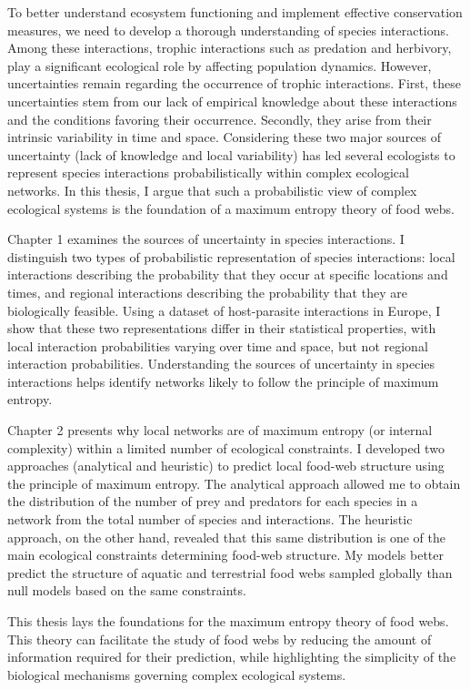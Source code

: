 \documentclass[12pt,twoside,phd]{dms}
\numberwithin{equation}{section}
\numberwithin{table}{chapter}
\numberwithin{figure}{chapter}
\begin{document}
To better understand ecosystem functioning and implement effective conservation
measures, we need to develop a thorough understanding of species
interactions. Among these interactions, trophic interactions such as predation
and herbivory, play a significant ecological role by affecting
population dynamics. However, uncertainties remain regarding the occurrence of
trophic interactions. First, these uncertainties stem from our lack of empirical
knowledge about these interactions and the conditions favoring their occurrence.
Secondly, they arise from their intrinsic variability in time and space.
Considering these two major sources of uncertainty (lack of knowledge and local
variability) has led several ecologists to represent species interactions
probabilistically within complex ecological networks. In this thesis, I argue
that such a probabilistic view of complex ecological systems is the foundation
of a maximum entropy theory of food webs.

Chapter 1 examines the sources of uncertainty in species interactions. I
distinguish two types of probabilistic representation of species interactions:
local interactions describing the probability that they occur at specific
locations and times, and regional interactions describing the probability that
they are biologically feasible. Using a dataset of host-parasite interactions in
Europe, I show that these two representations differ in their statistical
properties, with local interaction probabilities varying over time and space,
but not regional interaction probabilities. Understanding the sources of
uncertainty in species interactions helps identify networks likely to follow the
principle of maximum entropy.

Chapter 2 presents why local networks are of maximum entropy (or internal
complexity) within a limited number of ecological constraints. I developed two
approaches (analytical and heuristic) to predict local food-web structure using
the principle of maximum entropy. The analytical approach allowed me to obtain
the distribution of the number of prey and predators for each species in a
network from the total number of species and interactions. The heuristic
approach, on the other hand, revealed that this same distribution is one of the
main ecological constraints determining food-web structure. My models better
predict the structure of aquatic and terrestrial food webs sampled globally than
null models based on the same constraints.

This thesis lays the foundations for the maximum entropy theory of food webs.
This theory can facilitate the study of food webs by reducing the amount of
information required for their prediction, while highlighting the simplicity of
the biological mechanisms governing complex ecological systems.
\end{document}
